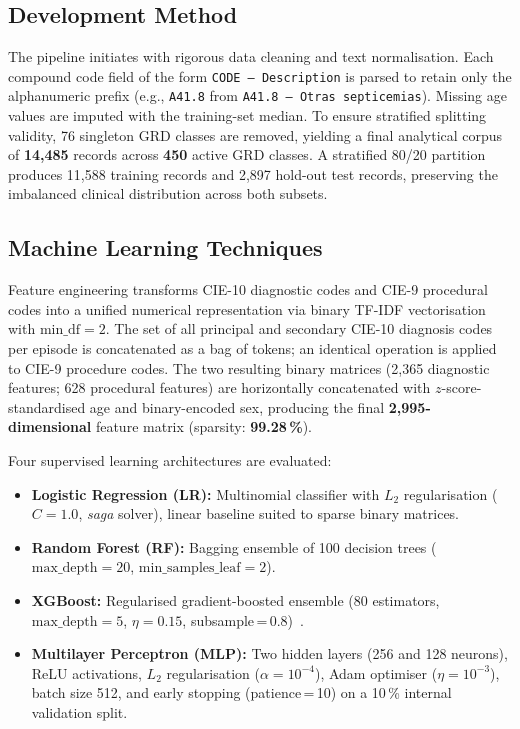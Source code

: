 \documentclass[journal]{IEEEtran}
\begin{document}
\subsection{Development Method}

The pipeline initiates with rigorous data cleaning and text
normalisation.  Each compound code field of the form
\texttt{CODE\,--\,Description} is parsed to retain only the
alphanumeric prefix (e.g., \texttt{A41.8} from
\texttt{A41.8\,--\,Otras septicemias}).  Missing age values
are imputed with the training-set median.  To ensure stratified
splitting validity, 76 singleton GRD classes are removed,
yielding a final analytical corpus of \textbf{14,485} records
across \textbf{450} active GRD classes.  A stratified 80/20
partition produces 11,588 training records and 2,897 hold-out
test records, preserving the imbalanced clinical distribution
across both subsets.

\subsection{Machine Learning Techniques}
\label{sec:techniques}

Feature engineering transforms CIE-10 diagnostic codes and
CIE-9 procedural codes into a unified numerical representation
via binary TF-IDF vectorisation with
$\mathrm{min\_df}{=}2$.  The set of all principal and secondary
CIE-10 diagnosis codes per episode is concatenated as a bag of
tokens; an identical operation is applied to CIE-9 procedure
codes.  The two resulting binary matrices (2,365 diagnostic
features; 628 procedural features) are horizontally concatenated
with $z$-score-standardised age and binary-encoded sex,
producing the final \textbf{2,995-dimensional} feature matrix
(sparsity: \textbf{99.28\,\%}).

Four supervised learning architectures are evaluated:

\begin{itemize}[leftmargin=*, itemsep=2pt]
  \item \textbf{Logistic Regression (LR):} Multinomial
        classifier with $L_2$ regularisation ($C{=}1.0$,
        \textit{saga} solver), linear baseline suited to
        sparse binary matrices.
  \item \textbf{Random Forest (RF):} Bagging ensemble of
        100 decision trees ($\mathrm{max\_depth}{=}20$,
        $\mathrm{min\_samples\_leaf}{=}2$).
  \item \textbf{XGBoost:} Regularised gradient-boosted
        ensemble (80 estimators, $\mathrm{max\_depth}{=}5$,
        $\eta{=}0.15$, subsample\,=\,0.8)~\cite{chen2016}.
  \item \textbf{Multilayer Perceptron (MLP):} Two hidden
        layers (256 and 128 neurons), ReLU activations,
        $L_2$ regularisation ($\alpha{=}10^{-4}$), Adam
        optimiser ($\eta{=}10^{-3}$), batch size 512, and
        early stopping (patience\,=\,10) on a 10\,\% internal
        validation split.
\end{itemize}
\end{document}
